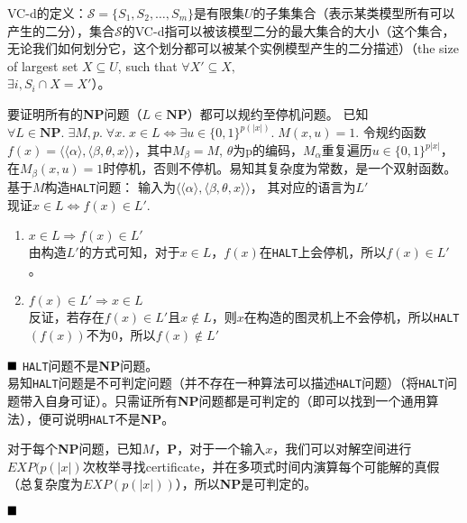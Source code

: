 \documentclass[11pt,largemargins]{homework}
\renewcommand{\qed}{$\hfill\blacksquare$}
\begin{document}
\maketitle


VC-d的定义：$\mathcal{S}=\{S_1,S_2,\dots,S_m\}$是有限集$U$的子集集合（表示某类模型所有可以产生的二分），集合$\mathcal{S}$的VC-d指可以被该模型二分的最大集合的大小（这个集合，无论我们如何划分它，这个划分都可以被某个实例模型产生的二分描述）（the size of largest set $X\subseteq U$, such that $\forall X'\subseteq X, $\\$\exists i, S_i \cap X = X'$）。%

\begin{alphaparts}
  \questionpart
  要证明所有的\textbf{NP}问题（$L\in \textbf{NP}$）都可以规约至停机问题。\newline
  已知$\forall L\in \textbf{NP}.\;\exists M,p.\;\forall x.\;x\in L \Leftrightarrow \exists u\in \{0,1\}^{p(|x|)}.\;M(x,u)=1.$\newline
  令规约函数$f(x) = \langle\langle\alpha\rangle, \langle\beta, \theta, x\rangle\rangle$，其中$M_\beta = M$, $\theta$为p的编码，$M_\alpha$重复遍历$u\in\{0,1\}^{p|x|}$，在$M_{\beta}(x, u) = 1$时停机，否则不停机。易知其复杂度为常数，是一个双射函数。\\
  基于$M$构造\texttt{HALT}问题：
  输入为$\langle\langle\alpha\rangle,\langle\beta, \theta, x\rangle\rangle$， 其对应的语言为$L'$\\
  现证$x\in{L}\Leftrightarrow f(x)\in {L'}$.
  \begin{enumerate}
    \item $x\in L\Rightarrow f(x)\in L'$\\
          由构造$L'$的方式可知，对于$x\in L$，$f(x)$在\texttt{HALT}上会停机，所以$f(x)\in L'$。
    \item $f(x)\in L'\Rightarrow x\in L$\\ 
          反证，若存在$f(x)\in L'$且$x\not\in L$，则$x$在构造的图灵机上不会停机，所以\texttt{HALT}$(f(x))$不为$0$，所以$f(x)\not\in L'$
  \end{enumerate}\qed
  \questionpart
  \texttt{HALT}问题不是\textbf{NP}问题。\\
  易知\texttt{HALT}问题是不可判定问题（并不存在一种算法可以描述\texttt{HALT}问题）（将\texttt{HALT}问题带入自身可证）。只需证所有\textbf{NP}问题都是可判定的（即可以找到一个通用算法），便可说明\texttt{HALT}不是\textbf{NP}。

  对于每个\textbf{NP}问题，已知$M$，\textbf{P}，对于一个输入$x$，我们可以对解空间进行$EXP(p(|x|)$次枚举寻找certificate，并在多项式时间内演算每个可能解的真假（总复杂度为$EXP(p(|x|))$），所以\textbf{NP}是可判定的。
  
  \qed
\end{alphaparts}
\end{document}
